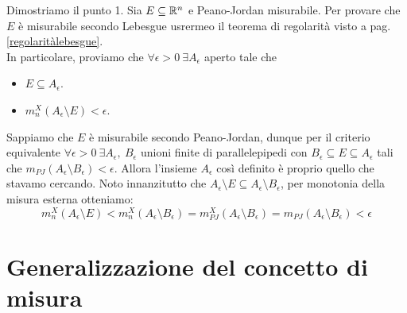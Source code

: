 \begin{demonstration}
	Dimostriamo il punto 1. Sia $E\subseteq \mathbb{R}^n$ e Peano-Jordan misurabile. Per provare che $E$ è misurabile secondo Lebesgue usrermeo il teorema di regolarità visto a pag. \ref{regolaritàlebesgue}.\\
	In particolare, proviamo che $\forall \epsilon >0\ \exists A_{\epsilon}$ aperto tale che
	\begin{itemize}
		\item $E\subseteq A_{\epsilon}$.
		\item $m_n^{X}\left(A_{\epsilon}\setminus E\right)<\epsilon$.
	\end{itemize}
Sappiamo che $E$ è misurabile secondo Peano-Jordan, dunque per il criterio equivalente $\forall \epsilon >0 \ \exists A_{\epsilon},\ B_{\epsilon}$ unioni finite di parallelepipedi con $B_{\epsilon}\subseteq E\subseteq A_{\epsilon}$ tali che $m_{PJ}\left(A_{\epsilon}\setminus B_{\epsilon}\right)<\epsilon$. Allora l'insieme $A_{\epsilon}$ così definito è proprio quello che stavamo cercando. Noto innanzitutto che $A_{\epsilon}\setminus E\subseteq A_{\epsilon}\setminus B_{\epsilon}$, per monotonia della misura esterna otteniamo:
\begin{equation*}
	m_{n}^{X}\left(A_{\epsilon}\setminus E\right)<	m_{n}^{X}\left(A_{\epsilon}\setminus B_{\epsilon}\right)=m_{PJ}^X\left(A_{\epsilon}\setminus B_{\epsilon}\right)=m_{PJ}\left(A_{\epsilon}\setminus B_{\epsilon}\right)<\epsilon
\end{equation*}
\end{demonstration}
\section{Generalizzazione del concetto di misura}
